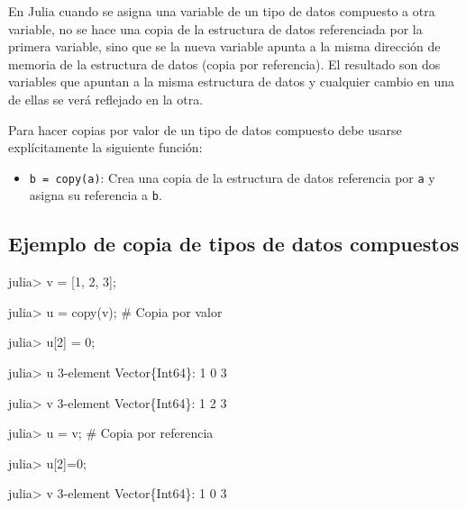 \documentclass[
  letterpaper,
  DIV=11,
  numbers=noendperiod]{scrreprt}
\newenvironment{Shaded}{\begin{snugshade}}{\end{snugshade}}
\newcommand{\CommentTok}[1]{\textcolor[rgb]{0.37,0.37,0.37}{#1}}
\newcommand{\DataTypeTok}[1]{\textcolor[rgb]{0.68,0.00,0.00}{#1}}
\newcommand{\FloatTok}[1]{\textcolor[rgb]{0.68,0.00,0.00}{#1}}
\newcommand{\FunctionTok}[1]{\textcolor[rgb]{0.28,0.35,0.67}{#1}}
\newcommand{\NormalTok}[1]{\textcolor[rgb]{0.00,0.23,0.31}{#1}}
\newcommand{\OperatorTok}[1]{\textcolor[rgb]{0.37,0.37,0.37}{#1}}
\providecommand{\tightlist}{%
  \setlength{\itemsep}{0pt}\setlength{\parskip}{0pt}}\usepackage{longtable,booktabs,array}
\begin{document}
En Julia cuando se asigna una variable de un tipo de datos compuesto a
otra variable, no se hace una copia de la estructura de datos
referenciada por la primera variable, sino que se la nueva variable
apunta a la misma dirección de memoria de la estructura de datos (copia
por referencia). El resultado son dos variables que apuntan a la misma
estructura de datos y cualquier cambio en una de ellas se verá reflejado
en la otra.

Para hacer copias por valor de un tipo de datos compuesto debe usarse
explícitamente la siguiente función:

\begin{itemize}
\tightlist
\item
  \texttt{b\ =\ copy(a)}: Crea una copia de la estructura de datos
  referencia por \texttt{a} y asigna su referencia a \texttt{b}.
\end{itemize}

\hypertarget{ejemplo-de-copia-de-tipos-de-datos-compuestos}{%
\subsection{Ejemplo de copia de tipos de datos
compuestos}\label{ejemplo-de-copia-de-tipos-de-datos-compuestos}}

\begin{Shaded}
\begin{Highlighting}[]
\NormalTok{julia}\OperatorTok{\textgreater{}}\NormalTok{ v }\OperatorTok{=}\NormalTok{ [}\FloatTok{1}\NormalTok{, }\FloatTok{2}\NormalTok{, }\FloatTok{3}\NormalTok{];}

\NormalTok{julia}\OperatorTok{\textgreater{}}\NormalTok{ u }\OperatorTok{=} \FunctionTok{copy}\NormalTok{(v);  }\CommentTok{\# Copia por valor}

\NormalTok{julia}\OperatorTok{\textgreater{}}\NormalTok{ u[}\FloatTok{2}\NormalTok{] }\OperatorTok{=} \FloatTok{0}\NormalTok{;}

\NormalTok{julia}\OperatorTok{\textgreater{}}\NormalTok{ u}
\FloatTok{3}\OperatorTok{{-}}\NormalTok{element }\DataTypeTok{Vector}\NormalTok{\{}\DataTypeTok{Int64}\NormalTok{\}}\OperatorTok{:}
 \FloatTok{1}
 \FloatTok{0}
 \FloatTok{3}

\NormalTok{julia}\OperatorTok{\textgreater{}}\NormalTok{ v}
\FloatTok{3}\OperatorTok{{-}}\NormalTok{element }\DataTypeTok{Vector}\NormalTok{\{}\DataTypeTok{Int64}\NormalTok{\}}\OperatorTok{:}
 \FloatTok{1}
 \FloatTok{2}
 \FloatTok{3}

\NormalTok{julia}\OperatorTok{\textgreater{}}\NormalTok{ u }\OperatorTok{=}\NormalTok{ v;  }\CommentTok{\# Copia por referencia}

\NormalTok{julia}\OperatorTok{\textgreater{}}\NormalTok{ u[}\FloatTok{2}\NormalTok{]}\OperatorTok{=}\FloatTok{0}\NormalTok{;}

\NormalTok{julia}\OperatorTok{\textgreater{}}\NormalTok{ v}
\FloatTok{3}\OperatorTok{{-}}\NormalTok{element }\DataTypeTok{Vector}\NormalTok{\{}\DataTypeTok{Int64}\NormalTok{\}}\OperatorTok{:}
 \FloatTok{1}
 \FloatTok{0}
 \FloatTok{3}
\end{Highlighting}
\end{Shaded}
\end{document}
